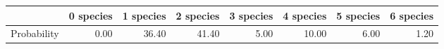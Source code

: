 \begin{table}[ht]
\centering
\begin{tabular}{rrrrrrrr}
  \hline
 & 0 species & 1 species & 2 species & 3 species & 4 species & 5 species & 6 species \\ 
  \hline
Probability & 0.00 & 36.40 & 41.40 & 5.00 & 10.00 & 6.00 & 1.20 \\ 
   \hline
\end{tabular}
\end{table}
